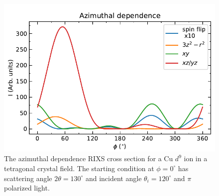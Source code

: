 \documentclass[aps,onecolumn, notitlepage, longbibliography]{revtex4-1}
\begin{document}
\begin{figure}
    \includegraphics{azimuthal.pdf}
    \caption{The azimuthal dependence RIXS cross section for a Cu $d^9$ ion in a tetragonal crystal field. The starting condition at $\phi=0^{\circ}$ has scattering angle $2\theta=130^{\circ}$ and incident angle $\theta_i=120^{\circ}$ and $\pi$ polarized light.  \label{azimuthal}}
\end{figure}
\end{document}
